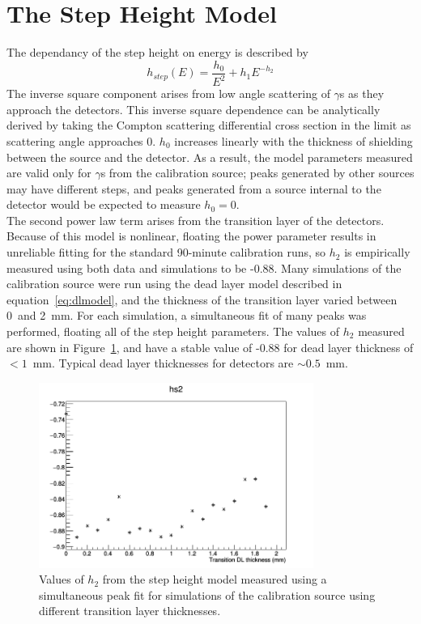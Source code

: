 \documentclass[/main.tex]{subfiles}
\begin{document}
\section{The Step Height Model} \label{sec:stepheight}
The dependancy of the step height on energy is described by
\begin{equation}
  h_{step}(E) = \frac{h_0}{E^2} + h_1E^{-h_2}
\end{equation}
The inverse square component arises from low angle scattering of $\gamma$s as they approach the detectors.
This inverse square dependence can be analytically derived by taking the Compton scattering differential cross section in the limit as scattering angle approaches 0\cite{2011Oberer}.
$h_0$ increases linearly with the thickness of shielding between the source and the detector.
As a result, the model parameters measured are valid only for $\gamma$s from the calibration source; peaks generated by other sources may have different steps, and peaks generated from a source internal to the detector would be expected to measure $h_0=0$.
\\
The second power law term arises from the transition layer of the detectors.
Because of this model is nonlinear, floating the power parameter results in unreliable fitting for the standard 90-minute calibration runs, so $h_2$ is empirically measured using both data and simulations to be -0.88.
Many simulations of the  calibration source were run using the dead layer model described in equation~\ref{eq:dlmodel}, and the thickness of the transition layer varied between 0~and 2~mm.
For each simulation, a simultaneous fit of many peaks was performed, floating all of the step height parameters.
The values of $h_2$ measured are shown in Figure~\ref{fig:stepheightpars_sim}, and have a stable value of -0.88 for dead layer thickness of $<1$~mm.
Typical dead layer thicknesses for detectors are $\sim0.5$~mm.
\begin{figure}[t]
  \centering
  \includegraphics[width=0.8\textwidth]{hs2_tl}
  \caption[Simulated dependance of $h_2$ on transition layer thickness] {\label{fig:stepheightpars_sim}
    Values of $h_2$ from the step height model measured using a simultaneous peak fit for simulations of the  calibration source using different transition layer thicknesses.
  }
\end{figure}
\end{document}
